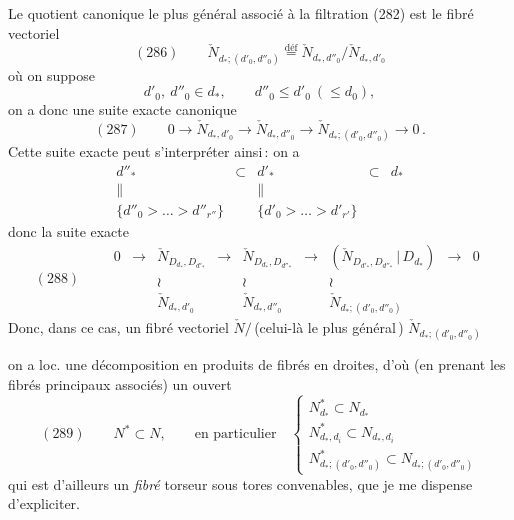 \documentclass[11pt,a4paper]{article}
\begin{document}
Le quotient canonique le plus général associé à la filtration (282) est le fibré vectoriel
\[ (286)\qquad \check{N}_{d_*;(d'_0,d''_0)}\overset{\text{déf}}{=}\check{N}_{d_*,d''_0}\big/\check{N}_{d_*,d'_0} \]
où on suppose
\[ d'_0,\ d''_0\in d_*,\qquad d''_0\leqslant d'_0\ (\leqslant d_0), \]
on a donc une suite exacte canonique
\[ (287)\qquad 0\longrightarrow\check{N}_{d_*,d'_0}\longrightarrow\check{N}_{d_*,d''_0}\longrightarrow\check{N}_{d_*;(d'_0,d''_0)}\longrightarrow 0\,. \]
Cette suite exacte peut s'interpréter ainsi\,: on a
\[ \begin{array}{ccccc} d''_* & \subset & d'_* & \subset & d_*\\ \| & & \| & & \\ \{d''_0>\dots>d''_{r''}\} & & \{d'_0>\dots>d'_{r'}\} & & \end{array} \]
donc la suite exacte
\[ (288)\qquad \begin{array}{ccccccccc} 0 & \to & \check{N}_{D_{d_*},D_{d'_*}} & \to & \check{N}_{D_{d_*},D_{d''_*}} & \to & (\check{N}_{D_{d'_*},D_{d''_*}}\,|\,D_{d_*}) & \to & 0\\ & & \wr & & \wr & & \wr & & \\ & & \check{N}_{d_*,d'_0} & & \check{N}_{d_*,d''_0} & & \check{N}_{d_*;(d'_0,d''_0)} & & \end{array} \]
Donc, dans ce cas, un fibré vectoriel $\check{N}/$\,(celui-là le plus général\,\ill{})   $\check{N}_{d_*;(d'_0,d''_0)}$

\ill{} on a loc. une décomposition en produits de fibrés en droites, d'où (en prenant les fibrés principaux associés) un ouvert
\[ (289)\qquad N^*\subset N,\qquad\text{en particulier}\quad \left\{\begin{array}{l} N^*_{d_*}\subset N_{d_*}\\ N^*_{d_*,d_i}\subset N_{d_*,d_i}\\ N^*_{d_*;(d'_0,d''_0)}\subset N_{d_*;(d'_0,d''_0)} \end{array}\right. \]
qui est d'ailleurs un \emph{fibré} torseur sous tores convenables, que je me dispense d'expliciter.
\end{document}
